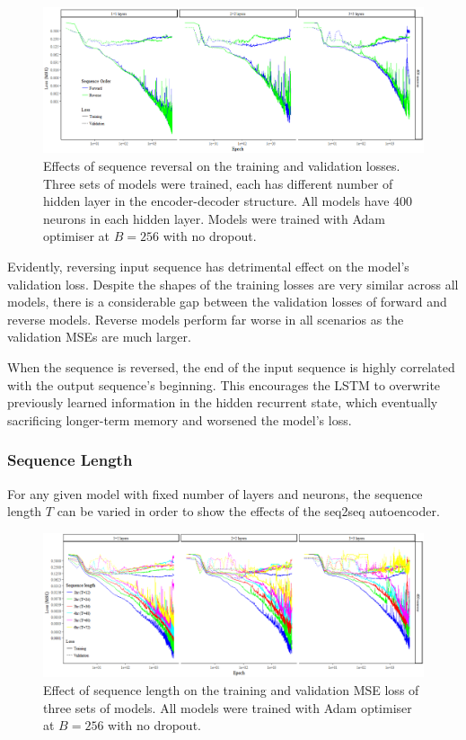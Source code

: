 \documentclass[11pt]{article} %
\theoremstyle{plain}
\theoremstyle{definition}
\begin{document}
\begin{figure}[H]
	\centering
	\includegraphics[width=1\textwidth]{reverse.PNG}
	\caption{Effects of sequence reversal on the training and validation losses. Three sets of models were trained, each has different number of hidden layer in the encoder-decoder structure. All models have \(400\) neurons in each hidden layer. Models were trained with Adam optimiser at \(B=256\) with no dropout.}
	\label{fig:reverse}
\end{figure}

Evidently, reversing input sequence has detrimental effect on the model’s validation loss. Despite the shapes of the training losses are very similar across all models, there is a considerable gap between the validation losses of forward and reverse models. Reverse models perform far worse in all scenarios as the validation MSEs are much larger.

When the sequence is reversed, the end of the input sequence is highly correlated with the output sequence’s beginning. This encourages the LSTM to overwrite previously learned information in the hidden recurrent state, which eventually sacrificing longer-term memory and worsened the model's loss. 

\subsubsection{Sequence Length}

For any given model with fixed number of layers and neurons, the sequence length \(T\) can be varied in order to show the effects of the seq2seq autoencoder. 

\begin{figure}[H]
	\centering
	\includegraphics[width=1\textwidth]{sequence_length.PNG}
	\caption{Effect of sequence length on the training and validation MSE loss of three sets of models. All models were trained with Adam optimiser at \(B=256\) with no dropout.}
	\label{fig:sequence_length}
\end{figure}
\end{document}
